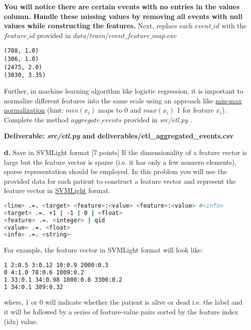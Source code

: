 \documentclass[12pt]{article}
\begin{document}
\textbf{You will notice there are certain events with no entries in the values column. Handle these missing values by removing all events with null values while constructing the features.}
Next, replace each $event\_id$ with the $feature\_id$ provided in $data/train/event\_feature\_map.csv$

\begin{lstlisting}[frame=single]
(708, 1.0)
(306, 1.0)
(2475, 2.0)
(3030, 3.35)
\end{lstlisting}

Further, in machine learning algorithm like logistic regression, it is important to normalize different features into the same scale using an approach like \href{http://stats.stackexchange.com/questions/70801/how-to-normalize-data-to-0-1-range}{min-max normalization} (hint: $min(x_i)$ maps to 0 and $max(x_i)$ 1 for feature $x_i$). Complete the method \textit{$aggregate\_events$} provided in \textit{src/etl.py} . 
\newline

\textbf{Deliverable: \textit{src/etl.py} and deliverables/etl\_aggregated\_events.csv}
\newline

\textbf{d.} Save in  SVMLight format [7 points]
\newline
If the dimensionality of a feature vector is large but the feature vector is sparse (i.e. it has only a few nonzero elements), sparse representation should be employed. In this problem you will use the provided data for each patient to construct a feature vector and represent the feature vector in \href{http://svmlight.joachims.org/}{SVMLight} format. \\

\begin{lstlisting}[frame=single, language=bash]
<line> .=. <target> <feature>:<value> <feature>:<value> #<info>
<target> .=. +1 | -1 | 0 | <float> 
<feature> .=. <integer> | qid
<value> .=. <float>
<info> .=. <string>
\end{lstlisting}

For example, the feature vector in SVMLight format will look like: \\

\begin{lstlisting}[frame=single, language=bash]
1 2:0.5 3:0.12 10:0.9 2000:0.3
0 4:1.0 78:0.6 1009:0.2
1 33:0.1 34:0.98 1000:0.8 3300:0.2
1 34:0.1 389:0.32 
\end{lstlisting}

where, 1 or 0 will indicate whether the patient is alive or dead i.e. the label and it will be followed by a series of feature-value pairs sorted by the feature index (idx) value. 
\newline
\end{document}
